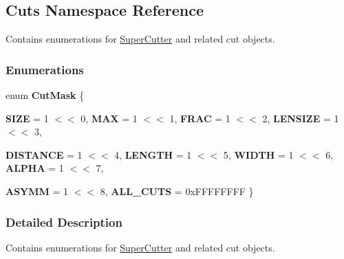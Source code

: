 \hypertarget{namespaceCuts}{
\subsection{Cuts Namespace Reference}
\label{namespaceCuts}
}


Contains enumerations for \hyperlink{classSuperCutter}{SuperCutter} and related cut objects.  


\subsubsection*{Enumerations}
\begin{DoxyCompactItemize}
\item 
enum {\bfseries CutMask} \{ \par
{\bfseries SIZE} =  1 $<$$<$ 0, 
{\bfseries MAX} =  1 $<$$<$ 1, 
{\bfseries FRAC} =  1 $<$$<$ 2, 
{\bfseries LENSIZE} =  1 $<$$<$ 3, 
\par
{\bfseries DISTANCE} =  1 $<$$<$ 4, 
{\bfseries LENGTH} =  1 $<$$<$ 5, 
{\bfseries WIDTH} =  1 $<$$<$ 6, 
{\bfseries ALPHA} =  1 $<$$<$ 7, 
\par
{\bfseries ASYMM} =  1 $<$$<$ 8, 
{\bfseries ALL\_\-CUTS} =  0xFFFFFFFF
 \}
\end{DoxyCompactItemize}


\subsubsection{Detailed Description}
Contains enumerations for \hyperlink{classSuperCutter}{SuperCutter} and related cut objects. 